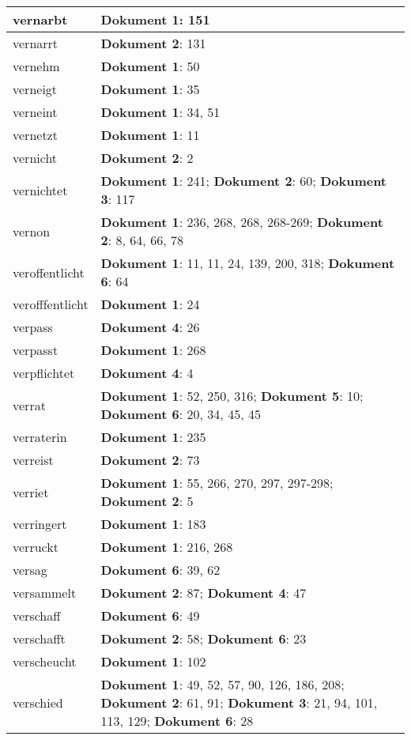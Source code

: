 \documentclass[a5paper]{article}
\begin{document}
\begin{longtable}[l]{|l|p{3in}|}
\hline
vernarbt & \textbf{Dokument 1}: 151 \\
\hline
vernarrt & \textbf{Dokument 2}: 131 \\
\hline
vernehm & \textbf{Dokument 1}: 50 \\
\hline
verneigt & \textbf{Dokument 1}: 35 \\
\hline
verneint & \textbf{Dokument 1}: 34, 51 \\
\hline
vernetzt & \textbf{Dokument 1}: 11 \\
\hline
vernicht & \textbf{Dokument 2}: 2 \\
\hline
vernichtet & \textbf{Dokument 1}: 241; \textbf{Dokument 2}: 60; \textbf{Dokument 3}: 117 \\
\hline
vernon & \textbf{Dokument 1}: 236, 268, 268, 268-269; \textbf{Dokument 2}: 8, 64, 66, 78 \\
\hline
veroffentlicht & \textbf{Dokument 1}: 11, 11, 24, 139, 200, 318; \textbf{Dokument 6}: 64 \\
\hline
verofffentlicht & \textbf{Dokument 1}: 24 \\
\hline
verpass & \textbf{Dokument 4}: 26 \\
\hline
verpasst & \textbf{Dokument 1}: 268 \\
\hline
verpflichtet & \textbf{Dokument 4}: 4 \\
\hline
verrat & \textbf{Dokument 1}: 52, 250, 316; \textbf{Dokument 5}: 10; \textbf{Dokument 6}: 20, 34, 45, 45 \\
\hline
verraterin & \textbf{Dokument 1}: 235 \\
\hline
verreist & \textbf{Dokument 2}: 73 \\
\hline
verriet & \textbf{Dokument 1}: 55, 266, 270, 297, 297-298; \textbf{Dokument 2}: 5 \\
\hline
verringert & \textbf{Dokument 1}: 183 \\
\hline
verruckt & \textbf{Dokument 1}: 216, 268 \\
\hline
versag & \textbf{Dokument 6}: 39, 62 \\
\hline
versammelt & \textbf{Dokument 2}: 87; \textbf{Dokument 4}: 47 \\
\hline
verschaff & \textbf{Dokument 6}: 49 \\
\hline
verschafft & \textbf{Dokument 2}: 58; \textbf{Dokument 6}: 23 \\
\hline
verscheucht & \textbf{Dokument 1}: 102 \\
\hline
verschied & \textbf{Dokument 1}: 49, 52, 57, 90, 126, 186, 208; \textbf{Dokument 2}: 61, 91; \textbf{Dokument 3}: 21, 94, 101, 113, 129; \textbf{Dokument 6}: 28 \\

\end{longtable}
\end{document}
